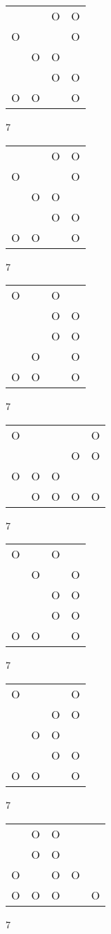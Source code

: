 \begin{tabular}{|m{0.2cm}m{0.2cm}m{0.2cm}m{0.2cm}|}\hline
 & &O&O\\
O& & &O\\
 &O&O& \\
 & &O&O\\
O&O& &O\\
\hline\end{tabular}7
\begin{tabular}{|m{0.2cm}m{0.2cm}m{0.2cm}m{0.2cm}|}\hline
 & &O&O\\
O& & &O\\
 &O&O& \\
 & &O&O\\
O&O& &O\\
\hline\end{tabular}7
\begin{tabular}{|m{0.2cm}m{0.2cm}m{0.2cm}m{0.2cm}|}\hline
O& &O& \\
 & &O&O\\
 & &O&O\\
 &O& &O\\
O&O& &O\\
\hline\end{tabular}7
\begin{tabular}{|m{0.2cm}m{0.2cm}m{0.2cm}m{0.2cm}m{0.2cm}|}\hline
O& & & &O\\
 & & &O&O\\
O&O&O& & \\
 &O&O&O&O\\
\hline\end{tabular}7
\begin{tabular}{|m{0.2cm}m{0.2cm}m{0.2cm}m{0.2cm}|}\hline
O& &O& \\
 &O& &O\\
 & &O&O\\
 & &O&O\\
O&O& &O\\
\hline\end{tabular}7
\begin{tabular}{|m{0.2cm}m{0.2cm}m{0.2cm}m{0.2cm}|}\hline
O& & &O\\
 & &O&O\\
 &O&O& \\
 & &O&O\\
O&O& &O\\
\hline\end{tabular}7
\begin{tabular}{|m{0.2cm}m{0.2cm}m{0.2cm}m{0.2cm}m{0.2cm}|}\hline
 &O&O& & \\
 &O&O& & \\
O& &O&O& \\
O&O&O& &O\\
\hline\end{tabular}7
